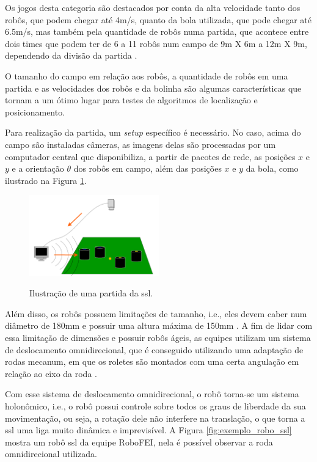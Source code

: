 \documentclass[acronym, symbols, table]{fei}
\begin{document}
		Os jogos desta categoria são destacados por conta da alta velocidade tanto dos robôs, que podem chegar até 4m/s, quanto da bola utilizada, que pode chegar até 6.5m/s, mas também pela quantidade de robôs numa partida, que acontece entre dois times que podem ter de 6 a 11 robôs num campo de 9m X 6m a 12m X 9m, dependendo da divisão da partida \cite{10332958}.
		
		O tamanho do campo em relação aos robôs, a quantidade de robôs em uma partida e as velocidades dos robôs e da bolinha são algumas características que tornam a  um ótimo lugar para testes de algoritmos de localização e posicionamento.
		
		Para realização da partida, um \textit{setup} específico é necessário. No caso, acima do campo são instaladas câmeras, as imagens delas são processadas por um computador central que disponibiliza, a partir de pacotes de rede, as posições $x$ e $y$ e a orientação $\theta$ dos robôs em campo, além das posições $x$ e $y$ da bola, como ilustrado na Figura \ref{fig:ilustracao_partida_ssl}.
		
		\begin{figure}[!htb]
			\centering
			\caption{Ilustração de uma partida da \acrshort{ssl}.} 
			\includegraphics[width=0.5\textwidth]{funcionamento_ssl.png}
			\label{fig:ilustracao_partida_ssl}
		\end{figure}
		
		Além disso, os robôs possuem limitações de tamanho, i.e., eles devem caber num diâmetro de 180mm e possuir uma altura máxima de 150mm \cite{rules}. A fim de lidar com essa limitação de dimensões e possuir robôs ágeis, as equipes utilizam um sistema de deslocamento omnidirecional, que é conseguido utilizando uma adaptação de rodas mecanum, em que os roletes são montados com uma certa angulação em relação ao eixo da roda \cite{aguiarreformulaccao}.
		
		Com esse sistema de deslocamento omnidirecional, o robô torna-se um sistema holonômico, i.e., o robô possui controle sobre todos os graus de liberdade da sua movimentação, ou seja, a rotação dele não interfere na translação, o que torna a \acrshort{ssl} uma liga muito dinâmica e imprevisível. A Figura \ref{fig:exemplo_robo_ssl} mostra um robô \acrshort{ssl} da equipe RoboFEI, nela é possível observar a roda omnidirecional utilizada.
		
\end{document}
